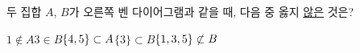 \noindent\begin{minipage}[t]{0.58\linewidth}\vspace{0pt}\raggedright 두 집합 $A$, $B$가 오른쪽 벤 다이어그램과 같을 때, 다음 중 옳지 \underline{않은} 것은?\end{minipage}\hfill\begin{minipage}[t]{0.4\linewidth}\vspace{0pt}\centering \resizebox{\ifdim\width>\linewidth\linewidth\else\width\fi}{!}{}\end{minipage}\par
\begin{choicesii}{$1\notin A$}{$3\in B$}{$\{4{,}\mkern3mu\mathopen{}5\}\subset A$}{$\{3\}\subset B$}{$\{1{,}\mkern3mu\mathopen{}3{,}\mkern3mu\mathopen{}5\}\not\subset B$}\end{choicesii}
